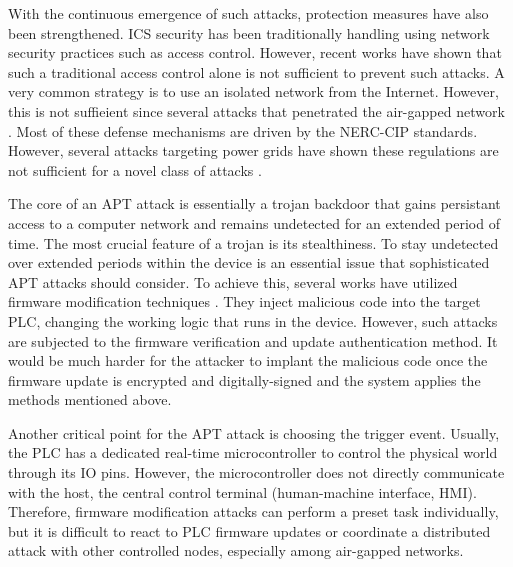
With the continuous emergence of such attacks, protection measures have also been strengthened. ICS security has been traditionally handling using network security practices such as access control. However, recent works have shown that such a traditional access control alone is not sufficient to prevent such attacks\cite{etigowni2016cpac}. A very common strategy is to use an isolated network from the Internet. However, this is not suffieient since several attacks that penetrated the air-gapped network \cite{cherepanov2016blackenergy, langner2011stuxnet, di2018triton}. Most of these defense mechanisms are driven by the NERC-CIP standards. However, several attacks targeting power grids have shown these regulations are not sufficient for a novel class of attacks \cite{huang2018algorithmic,garcia2017hey}.  


The core of an APT attack is essentially a trojan backdoor that gains persistant access to a computer network and remains undetected for an extended period of time. The most crucial feature of a trojan is its stealthiness. To stay undetected over extended periods within the device is an essential issue that sophisticated APT attacks should consider. To achieve this, several works have utilized firmware modification techniques \cite{garcia2017hey, newman2011scada, basnight2013firmware, blanco2012one, cui2013firmware, konstantinou2015impact, schulz2017nexmon}. They inject malicious code into the target PLC, changing the working logic that runs in the device. However, such attacks are subjected to the firmware verification \cite{mcminn2012firmware, wang2015confirm, lee2016binding, li2011viper, seshadri2004swatt, li2010sbap} and update authentication \cite{lee2017blockchain, moran2019firmware, choi2016secure} method. It would be much harder for the attacker to implant the malicious code once the firmware update is encrypted and digitally-signed and the system applies the methods mentioned above.

Another critical point for the APT attack is choosing the trigger event. Usually, the PLC has a dedicated real-time microcontroller to control the physical world through its IO pins. However, the microcontroller does not directly communicate with the host, the central control terminal (human-machine interface, HMI). Therefore, firmware modification attacks can perform a preset task individually, but it is difficult to react to PLC firmware updates or coordinate a distributed attack with other controlled nodes, especially among air-gapped networks.

